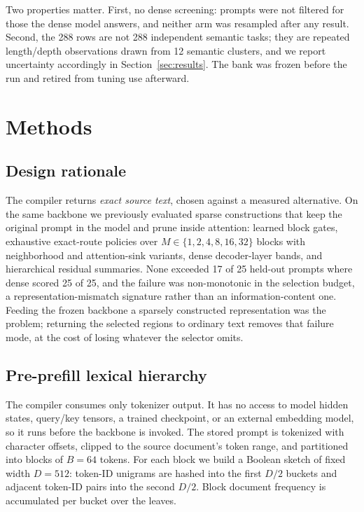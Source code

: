 \documentclass[conference]{IEEEtran}
\begin{document}
Two properties matter. First, no dense screening: prompts were not filtered for
those the dense model answers, and neither arm was resampled after any result. Second, the 288 rows are not
288 independent semantic tasks; they are repeated length/depth observations drawn
from 12 semantic clusters, and we report uncertainty accordingly in
Section~\ref{sec:results}. The bank was frozen before the run and retired from
tuning use afterward.

\section{Methods}

\subsection{Design rationale}

The compiler returns \emph{exact source text}, chosen against a measured
alternative. On the same backbone we previously evaluated sparse constructions that
keep the original prompt in the model and prune inside attention: learned block
gates, exhaustive exact-route policies over $M\in\{1,2,4,8,16,32\}$ blocks with
neighborhood and attention-sink variants, dense decoder-layer bands, and
hierarchical residual summaries. None
exceeded 17 of 25 held-out prompts where dense scored 25 of 25, and the failure was
non-monotonic in the selection budget, a representation-mismatch signature rather
than an information-content one. Feeding the frozen backbone a sparsely constructed
representation was the problem; returning the selected regions to ordinary text
removes that failure mode, at the cost of losing whatever the selector omits.

\subsection{Pre-prefill lexical hierarchy}

The compiler consumes only tokenizer output. It has no access to model hidden
states, query/key tensors, a trained checkpoint, or an external embedding model, so
it runs before the backbone is invoked. The stored prompt is tokenized with
character offsets, clipped to the source document's token range, and partitioned
into blocks of $B=64$ tokens. For each block we build a Boolean sketch of fixed
width $D=512$: token-ID unigrams are hashed into the first $D/2$ buckets and
adjacent token-ID pairs into the second $D/2$. Block document frequency is
accumulated per bucket over the leaves.
\end{document}
